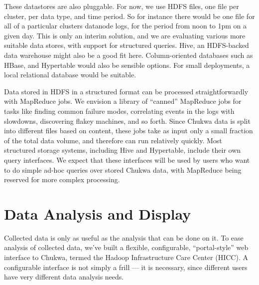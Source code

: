 \documentclass[letterpaper,twocolumn,10pt]{article}
\begin{document}
 These datastores are also pluggable. For now, we use HDFS files, one file per cluster, per data type, and time period.  So for instance there would be one file for all of a particular clusters datanode logs, for the period from noon to 1pm on a given day.   This is only an interim solution, and we are evaluating various more suitable data stores, with support for structured queries.  Hive, an HDFS-backed data warehouse might also be a good fit here. \cite{hive} 
 Column-oriented databases such as HBase, and Hypertable would also be sensible options.  For small deployments, a local relational database would be suitable.


Data stored in HDFS in a structured format can be processed straightforwardly with MapReduce jobs. We envision a library of ``canned'' MapReduce jobs for tasks like finding common failure modes, correlating events in the logs with slowdowns, discovering flakey machines, and so forth.  Since Chukwa data is split into different files based on content, these jobs take as input only a small fraction of the total data volume, and therefore can run relatively quickly.  Most structured storage systems, including Hive and Hypertable, include their own query interfaces. We expect that these interfaces will be used by users who want to do simple ad-hoc queries over stored Chukwa data, with MapReduce being reserved for more complex processing.


\section{Data Analysis and Display}



Collected data is only as useful as the analysis that can be done on it.  To ease analysis of collected data, we've built a flexible, configurable, ``portal-style'' web interface to Chukwa, termed the Hadoop Infrastructure Care Center (HICC). A configurable interface is not simply a frill --- it is necessary, since different users have very different data analysis needs.
\end{document}
